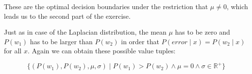 \documentclass[10pt,a4paper]{article}
\newcommand{\R}{\mathbb{R}}
\begin{document}
These are the optimal decision boundaries under the restriction that $\mu \not = 0$, which leads us to the second part of the exercise.

Just as in case of the Laplacian distribution, the mean $\mu$ has to be zero and $P(w_1)$ has to be larger than $P(w_2)$ in order that $P(error \mid x) = P(w_2 \mid x)$ for all $x$. Again we can obtain these possible value tuples:

$$\{ (P(w_1), P(w_2), \mu, \sigma) \mid P(w_1) > P(w_2) \land \mu = 0 \land \sigma \in \R^+ \}$$
\end{document}
